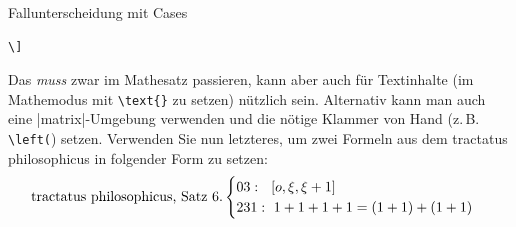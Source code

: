 \documentclass[
	vorläufig=false, 
	blattnr=2,
	ausgabe=2016-11-04,
	abgabe=2016-11-11,
	shortverb,
]{../tex/latexkurs-exercise}
\begin{document}
\begin{aufgabe}[3]{Fallunterscheidung mit Cases}
\begin{lstlisting}
\]                                                                                                                                                                                                                                                                                                                             
\end{lstlisting} 
   Das \emph{muss} zwar im Mathesatz passieren, kann aber auch für Textinhalte (im Mathemodus mit \texttt{\textbackslash text\{\}} zu setzen) nützlich sein. Alternativ kann man auch eine |matrix|-Umgebung verwenden und die nötige Klammer von Hand (z.\,B. \texttt{\textbackslash left(}) setzen. Verwenden Sie nun letzteres, um zwei Formeln aus dem tractatus philosophicus in folgender Form zu setzen:                                                                                                                                                                                                                            
     \begin{displaymath}                                                                                                                                                                                                                                                                                                    
     \text{tractatus philosophicus, Satz 6.}                                                                                                                                                                                                                                                                        		\begin{cases}                                                                                                                                                                                                                                                                                                  
        03:\hspace*{0.65em} [o,\xi, \xi +1]\\                                                                                                                                                                                                                                                                  
     		231:\ 1+1+1+1 = (1+1) + (1+1)                                                                                                                                                                                                                                                                          

\end{cases}
\end{displaymath}
\end{aufgabe}
\end{document}
